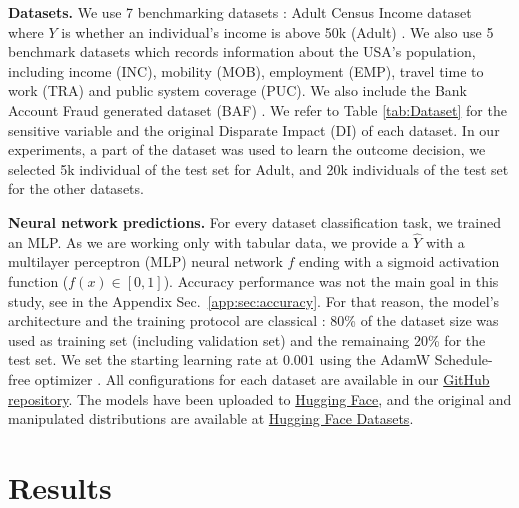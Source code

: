 \documentclass[runningheads, orivec]{llncs}
\begin{document}

\textbf{Datasets.} 
We use 7 benchmarking datasets : Adult Census Income dataset 
where $Y$ is whether an individual's income is above 50k (Adult) \cite{adult_2}. We also use 5 benchmark datasets \cite{ding2021retiring} which records information about the USA's population, including income (INC), mobility (MOB), employment (EMP), travel time to work (TRA) and public system coverage (PUC). We also include the Bank Account Fraud generated dataset (BAF) \cite{jesus2022turningtablesbiasedimbalanced}. We refer to Table \ref{tab:Dataset} for the sensitive variable and the original Disparate Impact (DI) of each dataset. In our experiments, a part of the dataset was used to learn the outcome decision, we selected 5k individual of the test set for Adult, and 20k individuals of the test set for the other datasets. 


\textbf{Neural network predictions.} For every dataset classification task, we trained an MLP. As we are working only with tabular data, we provide a $\widehat{Y}$ with a multilayer perceptron (MLP) neural network $f$ ending with a sigmoid activation function ($f(x)\in[0,1]$). Accuracy performance was not the main goal in this study, see in the Appendix Sec.~\ref{app:sec:accuracy}. For that reason, the model's architecture and the training protocol are classical : 80\% of the dataset size was used as training set (including validation set) and the remainaing 20\% for the test set. We set the starting learning rate at $0.001$ using the AdamW Schedule-free optimizer \cite{defazio2024road}. All configurations for each dataset are available in our \href{https://github.com/ValentinLafargue/Inspection}{GitHub repository}. The models have been uploaded to \href{https://huggingface.co/ValentinLAFARGUE/EIF-biased-classifiers}{Hugging Face}, and the original and manipulated distributions are available at \href{https://huggingface.co/datasets/ValentinLAFARGUE/EIF-Manipulated-distributions}{Hugging Face Datasets}.

\section{Results} %

\end{document}
